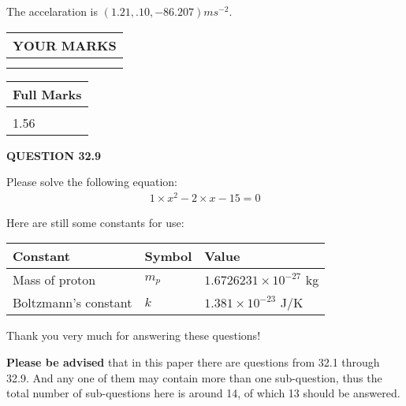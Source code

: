 \documentclass[12pt]{article}
\begin{document}
 
  The accelaration is $  %
(
1.21,
.10,
-86.207)
ms^{-2} $.
 
 
 

 
 
\vspace{0.3in}
  
\vspace{0.2in}
  
\noindent\begin{tabular}{|l|}
\hline
 YOUR MARKS  \\
\hline
 \\ 
 \\ 
\hline
\end{tabular}
\hspace{0.05in} \begin{tabular}{|l|}
\hline
 Full Marks  \\
\hline
 \\ 
1.56 \\
\hline
\end{tabular}
{\textbf{\Large{QUESTION
32.9 
}}}
  
  
 
 

 
Please solve the following equation:
\begin{eqnarray*}
1 \times x^2  %
-2
                 \times x    %
-15 =0
\end{eqnarray*}
 

 

 
\vspace{0.3in}
   
   
 \vspace{0.2in}
Here are still some constants for use:
 
 
\noindent\begin{tabular}{|l|l|l|}
\hline
Constant & Symbol & Value \\
\hline
 
Mass of proton &
$m_p$ &
 $ 1.6726231 \times 10^{-27} $
kg \\
\hline
 
Boltzmann's constant &
$k$ &
 $ 1.381 \times 10^{-23} $
J/K \\
\hline
 
\end{tabular}
 
Thank you very much for answering these questions!
 
{\textbf{\large{Please be advised}}} that in this paper there are questions from
32.1 through
32.9.
And any one of them may contain more than one sub-question, thus the total number
of sub-questions here is around 14, of which
13 should be answered.
 
\end{document}
